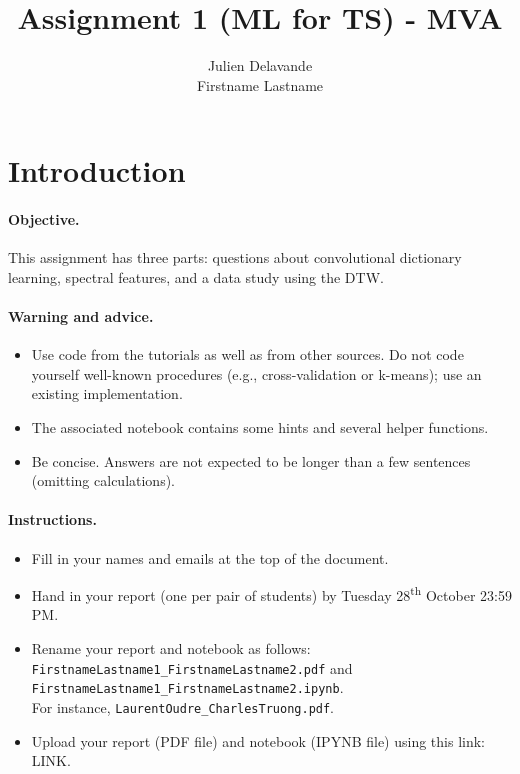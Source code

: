 \documentclass[11pt]{article}
\title{Assignment 1 (ML for TS) - MVA}
\author{
Julien Delavande \email{Julien.Delavande@ens-paris-saclay.fr} \\ %
Firstname Lastname \email{youremail2@mail.com} %
}
\begin{document}
\maketitle

\section{Introduction}

\paragraph{Objective.} This assignment has three parts: questions about convolutional dictionary learning, spectral features, and a data study using the DTW. 

\paragraph{Warning and advice.} 
\begin{itemize}
    \item Use code from the tutorials as well as from other sources. Do not code yourself well-known procedures (e.g., cross-validation or k-means); use an existing implementation. 
    \item The associated notebook contains some hints and several helper functions.
    \item Be concise. Answers are not expected to be longer than a few sentences (omitting calculations).
\end{itemize}



\paragraph{Instructions.}
\begin{itemize}
    \item Fill in your names and emails at the top of the document.
    \item Hand in your report (one per pair of students) by Tuesday 28\textsuperscript{th} October 23:59 PM.
    \item Rename your report and notebook as follows:\\ \texttt{FirstnameLastname1\_FirstnameLastname2.pdf} and\\ \texttt{FirstnameLastname1\_FirstnameLastname2.ipynb}.\\
    For instance, \texttt{LaurentOudre\_CharlesTruong.pdf}.
    \item Upload your report (PDF file) and notebook (IPYNB file) using this link: \footnotesize{LINK}.
\end{itemize}
\end{document}
